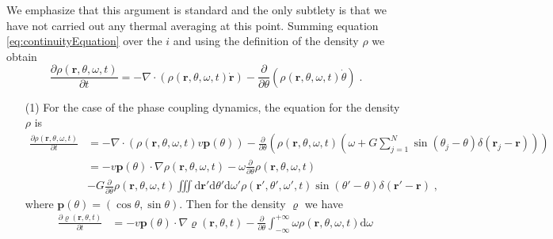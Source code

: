 \documentclass{article}
\begin{document}
We emphasize that this argument is standard and the only subtlety is that we have not carried out any thermal averaging at this point. Summing equation \eqref{eq:continuityEquation} over the $i$ and using the definition of the density $\rho$ we obtain
\begin{equation}
    \frac{\partial \rho \left( \mathbf{r},\theta ,\omega ,t \right)}{\partial t}=-\nabla \cdot \left( \rho \left( \mathbf{r},\theta ,\omega ,t \right) \mathbf{\dot{r}} \right) -\frac{\partial}{\partial \theta}\left( \rho \left( \mathbf{r},\theta ,\omega ,t \right) \dot{\theta} \right)\;.
\end{equation}
\begin{enumerate}
    \item[(1)] For the case of the phase coupling dynamics, the equation for the density $\rho$ is
    \begin{equation}
        \begin{aligned}
            \frac{\partial \rho \left( \mathbf{r},\theta ,\omega ,t \right)}{\partial t}&=-\nabla \cdot \left( \rho \left( \mathbf{r},\theta ,\omega ,t \right) v\mathbf{p}\left( \theta \right) \right) -\frac{\partial}{\partial \theta}\left( \rho \left( \mathbf{r},\theta ,\omega ,t \right) \left( \omega +G\sum_{j=1}^N{\sin \left( \theta _j-\theta \right) \delta \left( \mathbf{r}_j-\mathbf{r} \right)} \right) \right)\\
            &=-v\mathbf{p}\left( \theta \right) \cdot \nabla \rho \left( \mathbf{r},\theta ,\omega ,t \right) -\omega \frac{\partial}{\partial \theta}\rho \left( \mathbf{r},\theta ,\omega ,t \right) \\
            &-G\frac{\partial}{\partial \theta}\rho \left( \mathbf{r},\theta ,\omega ,t \right) \iiint{\text{d}\mathbf{r}'\text{d}\theta '\text{d}\omega '\rho \left( \mathbf{r}',\theta ',\omega ',t \right) \sin \left( \theta '-\theta \right) \delta \left( \mathbf{r}'-\mathbf{r} \right)}\;,
        \end{aligned}
    \end{equation}
    where $\mathbf{p}\left( \theta \right) =\left( \cos \theta ,\sin \theta \right)$. Then for the density $\varrho$ we have
    \begin{equation}
        \label{eq:coarseDensityAlign}
        \begin{aligned}
            \frac{\partial \varrho \left( \mathbf{r},\theta ,t \right)}{\partial t}&=-v\mathbf{p}\left( \theta \right) \cdot \nabla \varrho \left( \mathbf{r},\theta ,t \right) -\frac{\partial}{\partial \theta}\int_{-\infty}^{+\infty}{\omega \rho \left( \mathbf{r},\theta ,\omega ,t \right) \mathrm{d}\omega}\\

\end{aligned}
\end{equation}
\end{enumerate}
\end{document}
